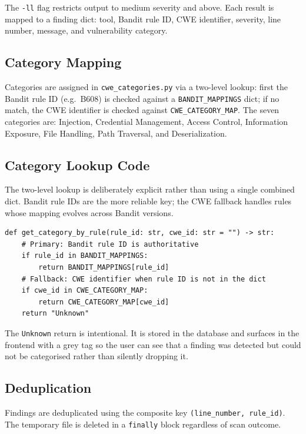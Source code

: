 \documentclass[12pt,a4paper]{report}
\begin{document}
The \texttt{-ll} flag restricts output to medium severity and above. Each result
is mapped to a finding dict: tool, Bandit rule ID, CWE identifier, severity,
line number, message, and vulnerability category.

\subsection{Category Mapping}

Categories are assigned in \texttt{cwe\_categories.py} via a two-level lookup:
first the Bandit rule ID (e.g.\ B608) is checked against a \texttt{BANDIT\_MAPPINGS}
dict; if no match, the CWE identifier is checked against \texttt{CWE\_CATEGORY\_MAP}.
The seven categories are: Injection, Credential Management, Access Control,
Information Exposure, File Handling, Path Traversal, and Deserialization.

\subsection{Category Lookup Code}

The two-level lookup is deliberately explicit rather than using a single combined
dict. Bandit rule IDs are the more reliable key; the CWE fallback handles rules
whose mapping evolves across Bandit versions.

\begin{lstlisting}[caption={Category resolution in \texttt{cwe\_categories.py}},
                   label={lst:catlookup}]
def get_category_by_rule(rule_id: str, cwe_id: str = "") -> str:
    # Primary: Bandit rule ID is authoritative
    if rule_id in BANDIT_MAPPINGS:
        return BANDIT_MAPPINGS[rule_id]
    # Fallback: CWE identifier when rule ID is not in the dict
    if cwe_id in CWE_CATEGORY_MAP:
        return CWE_CATEGORY_MAP[cwe_id]
    return "Unknown"
\end{lstlisting}

The \texttt{Unknown} return is intentional. It is stored in the database and
surfaces in the frontend with a grey tag so the user can see that a finding was
detected but could not be categorised rather than silently dropping it.

\subsection{Deduplication}

Findings are deduplicated using the composite key \texttt{(line\_number, rule\_id)}.
The temporary file is deleted in a \texttt{finally} block regardless of scan
outcome.
\end{document}
